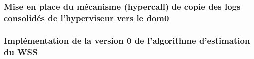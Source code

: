 
\subsubsection{Mise en place du mécanisme (hypercall) de copie des logs consolidés de l'hyperviseur vers le dom0}

\subsubsection{Implémentation de la version 0 de l'algorithme d'estimation du WSS}